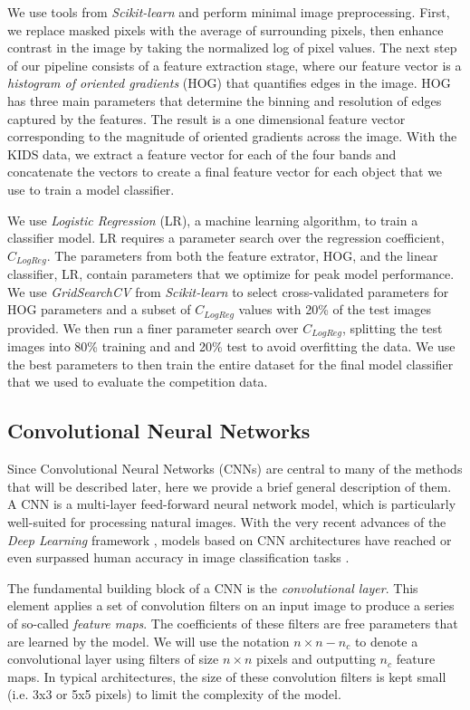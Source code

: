 \documentclass[useAMS,usenatbib]{mnras}
\begin{document}
We use tools from {\em Scikit-learn} \citep{pedregosa_etal12} and
perform minimal image preprocessing. First, we replace masked pixels
with the average of surrounding pixels, then enhance contrast in the
image by taking the normalized log of pixel values.  The next step of
our pipeline consists of a feature extraction stage, where our feature
vector is a {\em histogram of oriented gradients} (HOG)
\citep{dalalandtriggs_05} that quantifies edges in the image.  HOG has
three main parameters that determine the binning and resolution of
edges captured by the features.  The result is a one dimensional
feature vector corresponding to the magnitude of oriented gradients
across the image.  With the KIDS data, we extract a feature vector for
each of the four bands and concatenate the vectors to create a final
feature vector for each object that we use to train a model
classifier.

We use {\em Logistic Regression} (LR), a machine learning algorithm,
to train a classifier model.  LR requires a parameter search over the
regression coefficient, $C_{LogReg}$.  The parameters from both the
feature extrator, HOG, and the linear classifier, LR, contain
parameters that we optimize for peak model performance.  We use {\em
  GridSearchCV} from {\em Scikit-learn} to select cross-validated
parameters for HOG parameters and a subset of $C_{LogReg}$ values with
20\% of the test images provided.  We then run a finer parameter
search over $C_{LogReg}$, splitting the test images into 80\% training
and and 20\% test to avoid overfitting the data.  We use the best
parameters to then train the entire dataset for the final model
classifier that we used to evaluate the competition data.

\subsection{Convolutional Neural Networks}

Since Convolutional Neural Networks (CNNs) are central to many of the methods that will be described later, here we provide a brief general description of them.
A CNN \citep{Fukushima1980,Lecun1998} is a multi-layer feed-forward neural network model, which is particularly well-suited for processing natural images. With the very recent advances of the \textit{Deep Learning} framework \citep{Lecun2015}, models based on CNN architectures have reached or even surpassed human accuracy in image classification tasks \citep{He2015a}.

The fundamental building block of a CNN is the \textit{convolutional layer}. This element applies a set of convolution filters on an input image to produce a series of so-called \textit{feature maps}. The coefficients of these filters are free parameters that are learned by the model. We will use the notation 
$n \times n - n_c$ to denote a convolutional layer using filters of size $n \times n$ pixels and outputting $n_c$ feature maps.  In typical architectures, the size of these convolution filters is kept small (i.e. 3x3 or 5x5 pixels) to limit the complexity of the model. 
\end{document}
